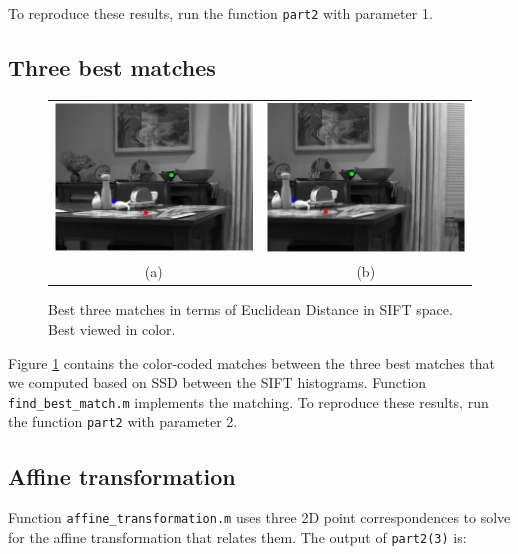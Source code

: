 \documentclass[11pt]{article} %
\begin{document}
To reproduce these results, run the function \texttt{part2} with parameter 1.

\subsection{Three best matches}

\begin{figure}[H]
	\centering
	\begin{tabular}{cc}
		\includegraphics[width=.5\textwidth]{figures/sift_threebest_left}& 
		\includegraphics[width=.5\textwidth]{figures/sift_threebest_right} \\
		(a) & (b)
	\end{tabular}
	\caption{Best three matches in terms of Euclidean Distance in SIFT space. Best viewed in color.}
	\label{fig:SIFT_matches}
\end{figure}

Figure \ref{fig:SIFT_matches} contains the color-coded matches between the three best matches that we computed based on SSD between the SIFT histograms. Function \texttt{find\_best\_match.m} implements the matching. To reproduce these results, run the function \texttt{part2} with parameter 2.

\subsection{Affine transformation}

Function \texttt{affine\_transformation.m} uses three 2D point correspondences to solve for the affine transformation that relates them. The output of \texttt{part2(3)} is:
\end{document}
